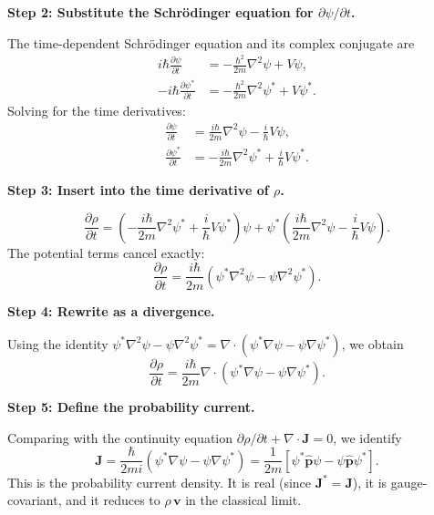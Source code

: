 \textbf{Step 2: Substitute the Schr\"{o}dinger equation for $\partial\psi/\partial t$.}

The time-dependent Schr\"{o}dinger equation and its complex conjugate are
\begin{align}
i\hbar\frac{\partial\psi}{\partial t} &= -\frac{\hbar^2}{2m}\nabla^2\psi + V\psi, \\
-i\hbar\frac{\partial\psi^*}{\partial t} &= -\frac{\hbar^2}{2m}\nabla^2\psi^* + V\psi^*.
\end{align}
Solving for the time derivatives:
\begin{align}
\frac{\partial\psi}{\partial t} &= \frac{i\hbar}{2m}\nabla^2\psi - \frac{i}{\hbar}V\psi, \\
\frac{\partial\psi^*}{\partial t} &= -\frac{i\hbar}{2m}\nabla^2\psi^* + \frac{i}{\hbar}V\psi^*.
\end{align}

\textbf{Step 3: Insert into the time derivative of $\rho$.}

\begin{equation}
\frac{\partial\rho}{\partial t} = \left(-\frac{i\hbar}{2m}\nabla^2\psi^* + \frac{i}{\hbar}V\psi^*\right)\psi + \psi^*\left(\frac{i\hbar}{2m}\nabla^2\psi - \frac{i}{\hbar}V\psi\right).
\end{equation}
The potential terms cancel exactly:
\begin{equation}
\frac{\partial\rho}{\partial t} = \frac{i\hbar}{2m}\left(\psi^*\nabla^2\psi - \psi\nabla^2\psi^*\right).
\end{equation}

\textbf{Step 4: Rewrite as a divergence.}

Using the identity $\psi^*\nabla^2\psi - \psi\nabla^2\psi^* = \nabla\cdot(\psi^*\nabla\psi - \psi\nabla\psi^*)$, we obtain
\begin{equation}
\frac{\partial\rho}{\partial t} = \frac{i\hbar}{2m}\nabla\cdot\left(\psi^*\nabla\psi - \psi\nabla\psi^*\right).
\end{equation}

\textbf{Step 5: Define the probability current.}

Comparing with the continuity equation $\partial\rho/\partial t + \nabla\cdot\mathbf{J} = 0$, we identify
\begin{equation}
\boxed{\mathbf{J} = \frac{\hbar}{2mi}\left(\psi^*\nabla\psi - \psi\nabla\psi^*\right) = \frac{1}{2m}\left[\psi^*\hat{\mathbf{p}}\psi - \psi\hat{\mathbf{p}}\psi^*\right].}
\end{equation}
This is the probability current density. It is real (since $\mathbf{J}^* = \mathbf{J}$), it is gauge-covariant, and it reduces to $\rho\,\mathbf{v}$ in the classical limit.

